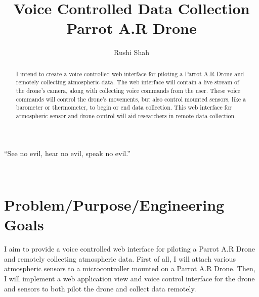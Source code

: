 \documentclass{article}
\title{Voice Controlled Data Collection Parrot A.R Drone}
\author{Rushi Shah}
\begin{document}
	\begin{singlespace}
		\maketitle
		\setlength{\epigraphwidth}{0.35\textwidth}
		\epigraph{``See no evil, hear no evil, speak no evil.''}{🙈🙉🙊}
	\end{singlespace}

	\begin{abstract}

	I intend to create a voice controlled web interface for piloting a Parrot A.R Drone and remotely collecting atmospheric data. The web interface will contain a live stream of the drone's camera, along with collecting voice commands from the user. These voice commands will control the drone's movements, but also control mounted sensors, like a barometer or thermometer, to begin or end data collection. This web interface for atmospheric sensor and drone control will aid researchers in remote data collection. 

	\end{abstract}

	\section{Problem/Purpose/Engineering Goals}
	I aim to provide a voice controlled web interface for piloting a Parrot A.R Drone and remotely collecting atmospheric data. First of all, I will attach various atmospheric sensors to a microcontroller mounted on a Parrot A.R Drone. Then, I will implement a web application view and voice control interface for the drone and sensors to both pilot the drone and collect data remotely. 
\end{document}
